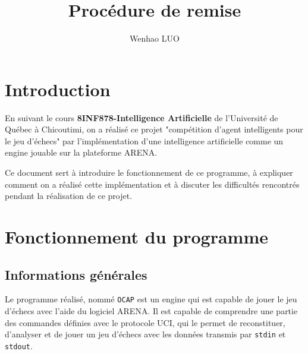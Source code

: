 \documentclass{article}
\author{Wenhao LUO}
\title{Procédure de remise}
\begin{document}
\maketitle
\date{}

\cleardoublepage
\tableofcontents

\clearpage

\section{Introduction}
\par En suivant le cours \textbf{8INF878-Intelligence Artificielle} de l'Université de Québec à Chicoutimi, on a réalisé ce projet "compétition d'agent intelligents pour le jeu d'échecs" par l'implémentation d'une intelligence artificielle comme un engine jouable sur la plateforme ARENA.

\par Ce document sert à introduire le fonctionnement de ce programme, à expliquer comment on a réalisé cette implémentation et à discuter les difficultés rencontrés pendant la réalisation de ce projet.

\section{Fonctionnement du programme}

\subsection{Informations générales}
\par Le programme réalisé, nommé \texttt{OCAP} est un engine qui est capable de jouer le jeu d'échecs avec l'aide du logiciel ARENA. Il est capable de comprendre une partie des commandes définies avec le protocole UCI, qui le permet de reconstituer, d'analyser et de jouer un jeu d'échecs avec les données transmis par \texttt{stdin} et \texttt{stdout}.
\end{document}
